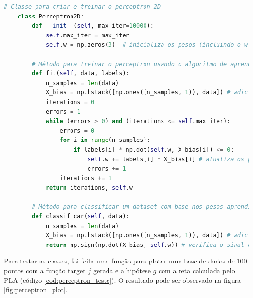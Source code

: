 \begin{lstlisting}[language=Python, caption=Perceptron, label=cod:perceptron]
    # Classe para criar e treinar o perceptron 2D
    class Perceptron2D:
        def __init__(self, max_iter=10000):
            self.max_iter = max_iter
            self.w = np.zeros(3)  # inicializa os pesos (incluindo o w_0)
        
        # Método para treinar o perceptron usando o algoritmo de aprendizagem perceptron (PLA)
        def fit(self, data, labels): 
            n_samples = len(data)
            X_bias = np.hstack([np.ones((n_samples, 1)), data]) # adiciona uma coluna de 1s para o X_0 (coordenada artificial)
            iterations = 0
            errors = 1
            while (errors > 0) and (iterations <= self.max_iter):
                errors = 0
                for i in range(n_samples):
                    if labels[i] * np.dot(self.w, X_bias[i]) <= 0:
                        self.w += labels[i] * X_bias[i] # atualiza os pesos
                        errors += 1
                iterations += 1
            return iterations, self.w
        
        # Método para classificar um dataset com base nos pesos aprendidos.
        def classificar(self, data):
            n_samples = len(data)
            X_bias = np.hstack([np.ones((n_samples, 1)), data]) # adiciona uma coluna de 1s para o bias X_0
            return np.sign(np.dot(X_bias, self.w)) # verifica o sinal do produto escalar entre x e w
\end{lstlisting}


Para testar as classes, foi feita uma função para plotar uma base de dados de 100 pontos com a função target $f$ gerada e a hipótese $g$ com a reta calculada pelo PLA (código \ref{cod:perceptron_teste}). O resultado pode ser observado na figura \ref{fig:perceptron_plot}. 

